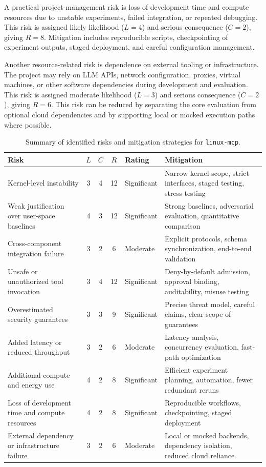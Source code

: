 A practical project-management risk is loss of development time and compute resources due to unstable experiments, failed integration, or repeated debugging.
This risk is assigned likely likelihood ($L = 4$) and serious consequence ($C = 2$), giving $R = 8$.
Mitigation includes reproducible scripts, checkpointing of experiment outputs, staged deployment, and careful configuration management.

Another resource-related risk is dependence on external tooling or infrastructure.
The project may rely on LLM APIs, network configuration, proxies, virtual machines, or other software dependencies during development and evaluation.
This risk is assigned moderate likelihood ($L = 3$) and serious consequence ($C = 2$), giving $R = 6$.
This risk can be reduced by separating the core evaluation from optional cloud dependencies and by supporting local or mocked execution paths where possible.

\begin{table}[t]
\centering
\caption{Summary of identified risks and mitigation strategies for \texttt{linux-mcp}.}
\begin{tabular}{p{4.1cm} c c c p{2.1cm} p{5.9cm}}
\hline
\textbf{Risk} & \textbf{$L$} & \textbf{$C$} & \textbf{$R$} & \textbf{Rating} & \textbf{Mitigation} \\
\hline
Kernel-level instability & 3 & 4 & 12 & Significant & Narrow kernel scope, strict interfaces, staged testing, stress testing \\
Weak justification over user-space baselines & 4 & 3 & 12 & Significant & Strong baselines, adversarial evaluation, quantitative comparison \\
Cross-component integration failure & 3 & 2 & 6 & Moderate & Explicit protocols, schema synchronization, end-to-end validation \\
Unsafe or unauthorized tool invocation & 3 & 4 & 12 & Significant & Deny-by-default admission, approval binding, auditability, misuse testing \\
Overestimated security guarantees & 3 & 3 & 9 & Significant & Precise threat model, careful claims, clear scope of guarantees \\
Added latency or reduced throughput & 3 & 2 & 6 & Moderate & Latency analysis, concurrency evaluation, fast-path optimization \\
Additional compute and energy use & 4 & 2 & 8 & Significant & Efficient experiment planning, automation, fewer redundant reruns \\
Loss of development time and compute resources & 4 & 2 & 8 & Significant & Reproducible workflows, checkpointing, staged deployment \\
External dependency or infrastructure failure & 3 & 2 & 6 & Moderate & Local or mocked backends, dependency isolation, reduced cloud reliance \\
\hline
\end{tabular}
\label{tab:risk_assessment}
\end{table}